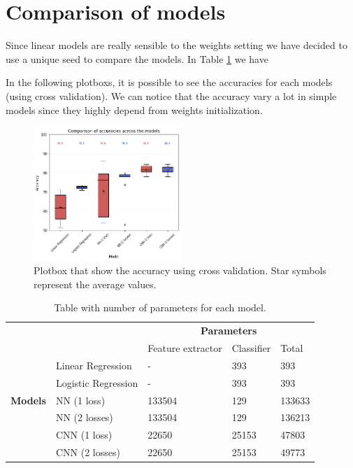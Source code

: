 \documentclass[journal, a4paper]{IEEEtran}
\begin{document}
\section{Comparison of models}
\label{sec:comparison}
Since linear models are really sensible to the weights setting 
we have decided to use a unique seed to compare the models.
In Table \ref{table:params} we have %


In the following plotboxs, it is possible to see the accuracies for each models (using cross validation). We can notice that the accuracy vary a lot in simple models since they highly depend from weights initialization.

\begin{figure}[!h]
    \centering
    \includegraphics[width=0.5\textwidth]{boxplot.png}
    \caption{Plotbox that show the accuracy using cross validation. Star symbols represent the average values.}
    \label{fig:train_acc_box}
\end{figure}




\begin{table}
\centering
\caption{Table with number of parameters for each model.}
\label{table:params}
\begin{tabular}{|l|l|l|l|l|} 
\cline{3-5}
\multicolumn{1}{l}{} &                     & \multicolumn{3}{c|}{\textbf{Parameters}}          \\ 
\cline{3-5}
\multicolumn{1}{l}{} &                     & Feature extractor & Classifier & Total   \\ 
\hline
                     & Linear Regression   & -                 & 393        & 393     \\ 
\cline{2-5}
               & Logistic Regression & -                 & 393        & 393     \\ 
\cline{2-5}
 \textbf{Models}   & NN (1 loss)~        & 133504            & 129        & 133633  \\ 
\cline{2-5}
                     & NN (2 losses)~      & 133504            & 129        & 136213  \\ 
\cline{2-5}
                     & CNN (1 loss)~       & 22650             & 25153      & 47803   \\ 
\cline{2-5}
                     & CNN (2 losses)      & 22650             & 25153      & 49773   \\
\hline
\end{tabular}
\end{table}
\end{document}
